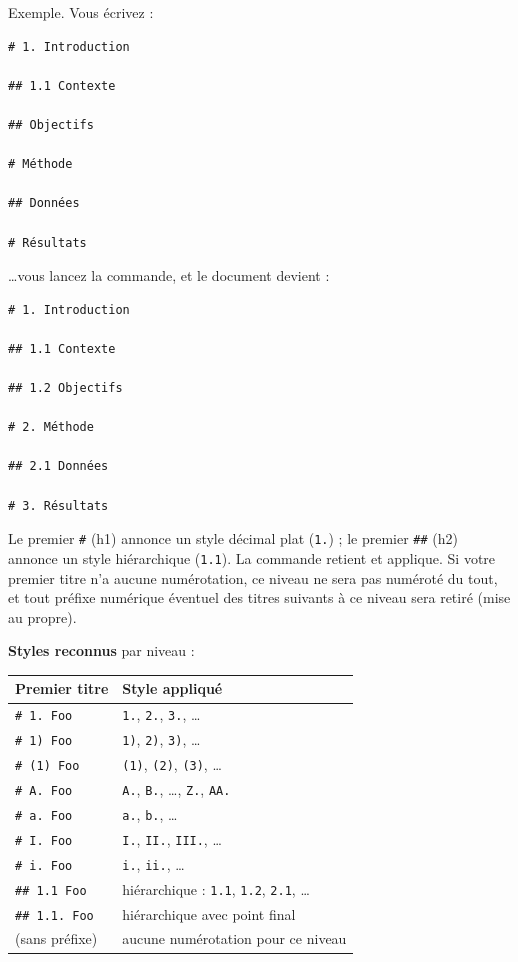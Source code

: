 \documentclass[11pt,a4paper]{article}
\theoremstyle{definition}
\begin{document}
Exemple. Vous écrivez :


\begin{lstlisting}
# 1. Introduction

## 1.1 Contexte

## Objectifs

# Méthode

## Données

# Résultats
\end{lstlisting}


…vous lancez la commande, et le document devient :


\begin{lstlisting}
# 1. Introduction

## 1.1 Contexte

## 1.2 Objectifs

# 2. Méthode

## 2.1 Données

# 3. Résultats
\end{lstlisting}


Le premier \texttt{\#} (h1) annonce un style décimal plat (\texttt{1.}) ; le premier
\texttt{\#\#} (h2) annonce un style hiérarchique (\texttt{1.1}). La commande retient
et applique. Si votre premier titre n'a aucune numérotation, ce
niveau ne sera pas numéroté du tout, et tout préfixe numérique
éventuel des titres suivants à ce niveau sera retiré (mise au propre).


\textbf{Styles reconnus} par niveau :


\begin{tabularx}{\textwidth}{>{\raggedright\arraybackslash}X>{\raggedright\arraybackslash}X}
  \toprule
  Premier titre & Style appliqué \\
  \midrule
  \texttt{\# 1. Foo} & \texttt{1.}, \texttt{2.}, \texttt{3.}, … \\
  \texttt{\# 1) Foo} & \texttt{1)}, \texttt{2)}, \texttt{3)}, … \\
  \texttt{\# (1) Foo} & \texttt{(1)}, \texttt{(2)}, \texttt{(3)}, … \\
  \texttt{\# A. Foo} & \texttt{A.}, \texttt{B.}, …, \texttt{Z.}, \texttt{AA.} \\
  \texttt{\# a. Foo} & \texttt{a.}, \texttt{b.}, … \\
  \texttt{\# I. Foo} & \texttt{I.}, \texttt{II.}, \texttt{III.}, … \\
  \texttt{\# i. Foo} & \texttt{i.}, \texttt{ii.}, … \\
  \texttt{\#\# 1.1 Foo} & hiérarchique : \texttt{1.1}, \texttt{1.2}, \texttt{2.1}, … \\
  \texttt{\#\# 1.1. Foo} & hiérarchique avec point final \\
  (sans préfixe) & aucune numérotation pour ce niveau \\
  \bottomrule
\end{tabularx}
\end{document}
